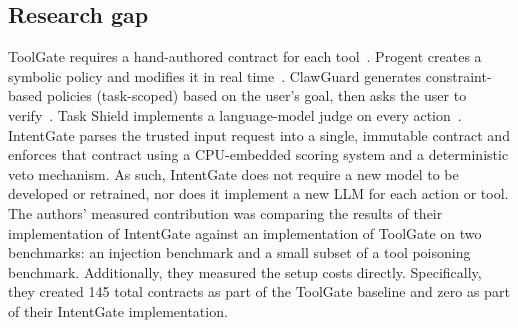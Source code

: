 \documentclass[a4paper,conference]{IEEEtran}
\begin{document}
\subsection{Research gap}
ToolGate requires a hand-authored contract for each tool~\cite{liu2026toolgate}. Progent creates a symbolic policy and modifies it in real time~\cite{shi2025progent}. ClawGuard generates constraint-based policies (task-scoped) based on the user's goal, then asks the user to verify~\cite{clawguard2026}. Task Shield implements a language-model judge on every action~\cite{taskshield2025}. IntentGate parses the trusted input request into a single, immutable contract and enforces that contract using a CPU-embedded scoring system and a deterministic veto mechanism. As such, IntentGate does not require a new model to be developed or retrained, nor does it implement a new LLM for each action or tool. The authors' measured contribution was comparing the results of their implementation of IntentGate against an implementation of ToolGate on two benchmarks: an injection benchmark and a small subset of a tool poisoning benchmark. Additionally, they measured the setup costs directly. Specifically, they created 145 total contracts as part of the ToolGate baseline and zero as part of their IntentGate implementation.
\end{document}
